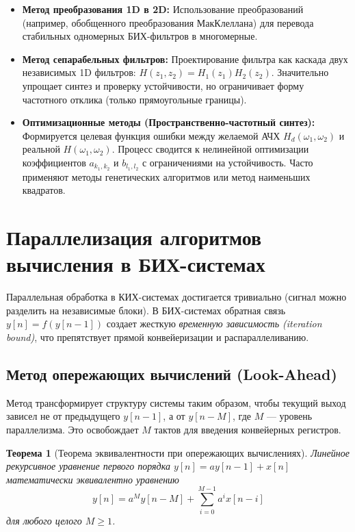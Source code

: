 \documentclass[12pt,a4paper]{article}
\newtheorem{theorem}{Теорема}
\begin{document}
\begin{itemize}
    \item \textbf{Метод преобразования 1D в 2D:} Использование преобразований (например, обобщенного преобразования МакКлеллана) для перевода стабильных одномерных БИХ-фильтров в многомерные.
    \item \textbf{Метод сепарабельных фильтров:} Проектирование фильтра как каскада двух независимых 1D фильтров: $H(z_1, z_2) = H_1(z_1)H_2(z_2)$. Значительно упрощает синтез и проверку устойчивости, но ограничивает форму частотного отклика (только прямоугольные границы).
    \item \textbf{Оптимизационные методы (Пространственно-частотный синтез):} Формируется целевая функция ошибки между желаемой АЧХ $H_d(\omega_1, \omega_2)$ и реальной $H(\omega_1, \omega_2)$. Процесс сводится к нелинейной оптимизации коэффициентов $a_{k_1, k_2}$ и $b_{l_1, l_2}$ с ограничениями на устойчивость. Часто применяют методы генетических алгоритмов или метод наименьших квадратов.
\end{itemize}


\section{Параллелизация алгоритмов вычисления в БИХ-системах}

Параллельная обработка в КИХ-системах достигается тривиально (сигнал можно разделить на независимые блоки). В БИХ-системах обратная связь $y[n] = f(y[n-1])$ создает жесткую \textit{временную зависимость (iteration bound)}, что препятствует прямой конвейеризации и распараллеливанию.

\subsection{Метод опережающих вычислений (Look-Ahead)}

Метод трансформирует структуру системы таким образом, чтобы текущий выход зависел не от предыдущего $y[n-1]$, а от $y[n-M]$, где $M$ — уровень параллелизма. Это освобождает $M$ тактов для введения конвейерных регистров.

\begin{theorem}[Теорема эквивалентности при опережающих вычислениях]
Линейное рекурсивное уравнение первого порядка $y[n] = a y[n-1] + x[n]$ математически эквивалентно уравнению
\begin{equation}
    y[n] = a^M y[n-M] + \sum_{i=0}^{M-1} a^i x[n-i]
\end{equation}
для любого целого $M \ge 1$.
\end{theorem}
\end{document}
